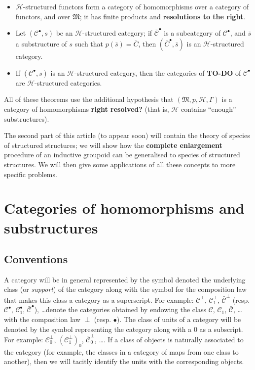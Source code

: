 \documentclass[fleqn]{article}
\newcommand{\todo}{{\color{purple}\textbf{TO-DO }}}
\newcommand{\unsure}[1]{{\color{purple}\textbf{#1}}}
\newcommand{\CC}{\mathcal{C}}
\newcommand{\HH}{\mathcal{H}}
\newcommand{\MM}{\mathfrak{M}}
\begin{document}
\begin{itemize}
  \item $\HH$-structured functors form a category of homomorphisms over a category of functors, and over $\MM$;
    it has finite products and \unsure{resolutions to the right}.
  \item Let $(\CC^\bullet,s)$ be an $\HH$-structured category;
    if $\bar{\CC}^\bullet$ is a subcategory of $\CC^\bullet$, and $\bar{s}$ a substructure of $s$ such that $p(\bar{s})=\bar{C}$, then $(\bar{C}^\bullet,\bar{s})$ is an $\HH$-structured category.
  \item If $(\CC^\bullet,s)$ is an $\HH$-structured category, then the categories of \todo of $\CC^\bullet$ are $\HH$-structured categories.
\end{itemize}

All of these theorems use the additional hypothesis that $(\MM,p,\HH,\Gamma)$ is a category of homomorphisms \unsure{right resolved?} (that is, $\HH$ contains ``enough'' substructures).

The second part of this article (to appear soon) will contain the theory of species of structured structures;
we will show how the \unsure{complete enlargement} procedure of an inductive groupoid can be generalised to species of structured structures.
We will then give some applications of all these concepts to more specific problems.



\section{Categories of homomorphisms and substructures}
\label{section:i}

\subsection{Conventions}
\label{section:i.1}

A category will be in general represented by the symbol denoted the underlying class (or \emph{support}) of the category along with the symbol for the composition law that makes this class a category as a superscript.
For example: $\CC^\perp$, $\CC_1^\perp$, $\bar{\CC}^\perp$ (resp. $\CC^\bullet$, $\CC_1^\bullet$, $\bar{\CC}^\bullet$), \ldots denote the categories obtained by endowing the class $\CC$, $\CC_1$, $\bar{\CC}$, \ldots with the composition law $\perp$ (resp. $\bullet$).
The class of units of a category will be denoted by the symbol representing the category along with a $0$ as a subscript.
For example: $\CC_0^\perp$, $(\CC_1^\perp)_0$, $\bar{\CC}_0^\perp$, \ldots.
If a class of objects is naturally associated to the category (for example, the classes in a category of maps from one class to another), then we will tacitly identify the units with the corresponding objects.
\end{document}
